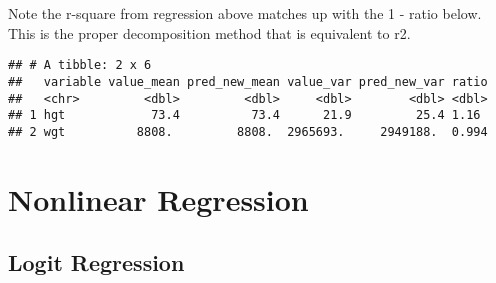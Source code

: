 \documentclass[
]{book}
\newenvironment{Shaded}{\begin{snugshade}}{\end{snugshade}}
\newcommand{\DataTypeTok}[1]{\textcolor[rgb]{0.13,0.29,0.53}{#1}}
\newcommand{\KeywordTok}[1]{\textcolor[rgb]{0.13,0.29,0.53}{\textbf{#1}}}
\newcommand{\NormalTok}[1]{#1}
\newcommand{\OperatorTok}[1]{\textcolor[rgb]{0.81,0.36,0.00}{\textbf{#1}}}
\newcommand{\StringTok}[1]{\textcolor[rgb]{0.31,0.60,0.02}{#1}}
\begin{document}
Note the r-square from regression above matches up with the 1 - ratio below. This is the proper decomposition method that is equivalent to r2.

\begin{Shaded}
\end{Shaded}

\begin{verbatim}
## # A tibble: 2 x 6
##   variable value_mean pred_new_mean value_var pred_new_var ratio
##   <chr>         <dbl>         <dbl>     <dbl>        <dbl> <dbl>
## 1 hgt            73.4          73.4      21.9         25.4 1.16 
## 2 wgt          8808.         8808.  2965693.     2949188.  0.994
\end{verbatim}

\hypertarget{nonlinear-regression}{%
\chapter{Nonlinear Regression}\label{nonlinear-regression}}

\hypertarget{logit-regression}{%
\section{Logit Regression}\label{logit-regression}}
\end{document}
